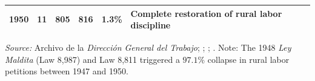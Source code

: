 \begin{table}[htbp]
\begin{tabularx}{\textwidth}{lccccX}
1950 & 11 & 805 & 816 & 1.3\% & Complete restoration of rural labor discipline \\
\bottomrule
\end{tabularx}
\begin{minipage}{\textwidth}
\vspace{0.3em}
\footnotesize
\textit{Source:} Archivo de la \textit{Dirección General del Trabajo}; \citet{MorrisOyaneder1962}; \citet{Loveman1971,Loveman1976}; \citet{BravoVargas2017}. Note: The 1948 \textit{Ley Maldita} (Law 8,987) and Law 8,811 triggered a $97.1\%$ collapse in rural labor petitions between 1947 and 1950.
\end{minipage}
\end{table}
